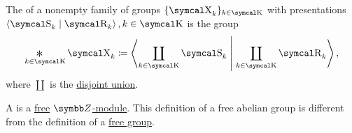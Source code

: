 \begin{definition}\label{def:group_free_product}
  The  of a nonempty family of groups \( \{ \CX_k \}_{k \in \CK} \) with presentations \( \Gen{\CS_k \mid \CR_k}, k \in \CK \) is the group
  \begin{equation*}
    \Ast_{k \in \CK} \CX_k \coloneqq \Gen{ \coprod_{k \in \CK} \CS_k \;\middle\vert\; \coprod_{k \in \CK} \CR_k },
  \end{equation*}
  where \( \coprod \) is the \hyperref[def:disjoint_union]{disjoint union}.
\end{definition}

\begin{definition}\label{def:free_abelian_group}
  A  is a \hyperref[def:free_left_module]{free} \hyperref[thm:abelian_group_iff_z_module]{\( \BZ \)-module}. This definition of a free abelian group is different from the definition of a \hyperref[def:free_group]{free group}.
\end{definition}
